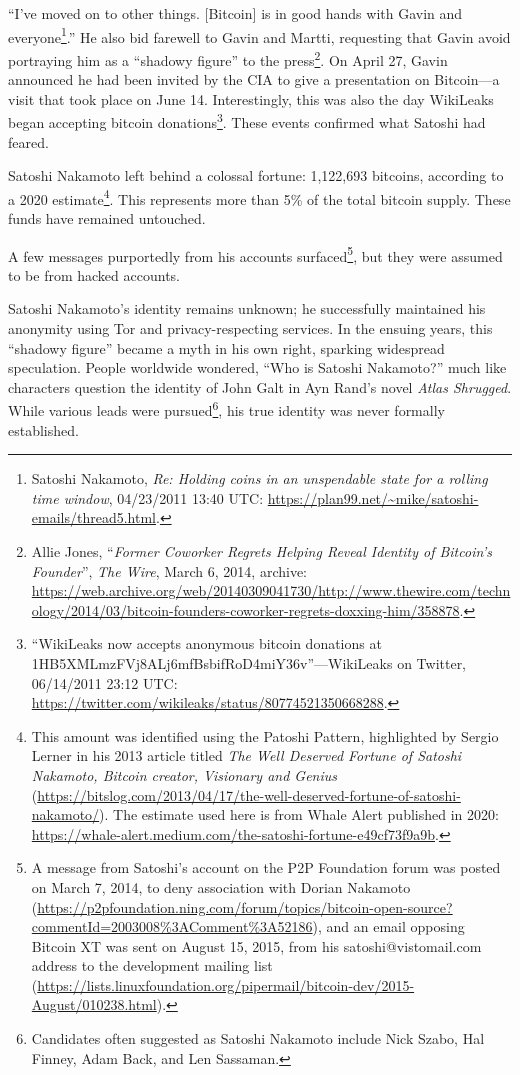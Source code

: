 \documentclass[
  a5paper,
  smalldemyvopaper,10pt,twoside,onecolumn,openright,extrafontsizes,hidelinks]{memoir}
\begin{document}
``I've moved on to other things. {[}Bitcoin{]} is in good hands with
Gavin and everyone\footnote{Satoshi Nakamoto, \emph{Re: Holding coins in
  an unspendable state for a rolling time window}, 04/23/2011 13:40 UTC:
  \url{https://plan99.net/~mike/satoshi-emails/thread5.html}.}.'' He
also bid farewell to Gavin and Martti, requesting that Gavin avoid
portraying him as a ``shadowy figure'' to the press\footnote{Allie
  Jones, ``\emph{Former Coworker Regrets Helping Reveal Identity of
  Bitcoin's Founder}'', \emph{The Wire}, March 6, 2014, archive:
  \url{https://web.archive.org/web/20140309041730/http://www.thewire.com/technology/2014/03/bitcoin-founders-coworker-regrets-doxxing-him/358878}.}.
On April 27, Gavin announced he had been invited by the CIA to give a
presentation on Bitcoin---a visit that took place on June 14.
Interestingly, this was also the day WikiLeaks began accepting bitcoin
donations\footnote{``WikiLeaks now accepts anonymous bitcoin donations
  at 1HB5XMLmzFVj8ALj6mfBsbifRoD4miY36v''---WikiLeaks on Twitter,
  06/14/2011 23:12 UTC:
  \url{https://twitter.com/wikileaks/status/80774521350668288}.}. These
events confirmed what Satoshi had feared.

Satoshi Nakamoto left behind a colossal fortune: 1,122,693 bitcoins,
according to a 2020 estimate\footnote{This amount was identified using
  the Patoshi Pattern, highlighted by Sergio Lerner in his 2013 article
  titled \emph{The Well Deserved Fortune of Satoshi Nakamoto, Bitcoin
  creator, Visionary and Genius}
  (\url{https://bitslog.com/2013/04/17/the-well-deserved-fortune-of-satoshi-nakamoto/}).
  The estimate used here is from Whale Alert published in 2020:
  \url{https://whale-alert.medium.com/the-satoshi-fortune-e49cf73f9a9b}.}.
This represents more than 5\% of the total bitcoin supply. These funds
have remained untouched.

A few messages purportedly from his accounts surfaced\footnote{A message
  from Satoshi's account on the P2P Foundation forum was posted on March
  7, 2014, to deny association with Dorian Nakamoto
  (\url{https://p2pfoundation.ning.com/forum/topics/bitcoin-open-source?commentId=2003008\%3AComment\%3A52186}),
  and an email opposing Bitcoin XT was sent on August 15, 2015, from his
  satoshi@vistomail.com address to the development mailing list
  (\url{https://lists.linuxfoundation.org/pipermail/bitcoin-dev/2015-August/010238.html}).},
but they were assumed to be from hacked accounts.

Satoshi Nakamoto's identity remains unknown; he successfully maintained
his anonymity using Tor and privacy-respecting services. In the ensuing
years, this ``shadowy figure'' became a myth in his own right, sparking
widespread speculation. People worldwide wondered, ``Who is Satoshi
Nakamoto?'' much like characters question the identity of John Galt in
Ayn Rand's novel \emph{Atlas Shrugged}. While various leads were
pursued\footnote{Candidates often suggested as Satoshi Nakamoto include
  Nick Szabo, Hal Finney, Adam Back, and Len Sassaman.}, his true
identity was never formally established.
\end{document}
